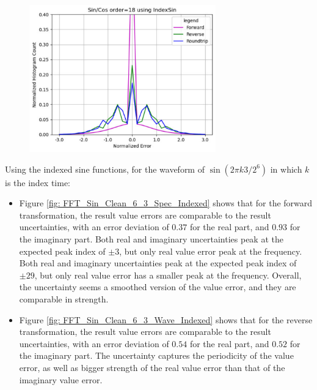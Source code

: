 \documentclass[twoside]{article}
\numberwithin{equation}{section}
\begin{document}
\begin{figure}[p]
\centering
\includegraphics[height=2.5in]{FFT_SinCos_Clean_Histo_Indexed.pdf} 
\label{fig: FFT_SinCos_Clean_Histo_Indexed}
\end{figure}

Using the indexed sine functions, for the waveform of $\sin(2\pi k 3/2^6)$ in which $k$ is the index time:
\begin{itemize}
\item Figure \ref{fig: FFT_Sin_Clean_6_3_Spec_Indexed} shows that for the forward transformation,  the result value errors are comparable to the result uncertainties, with an error deviation of $0.37$ for the real part, and $0.93$ for the imaginary part.
Both real and imaginary uncertainties peak at the expected peak index of $\pm 3$, but only real value error peak at the frequency.
Both real and imaginary uncertainties peak at the expected peak index of $\pm 29$, but only real value error has a smaller peak at the frequency.  
Overall, the uncertainty seems a smoothed version of the value error, and they are comparable in strength.

\item Figure \ref{fig: FFT_Sin_Clean_6_3_Wave_Indexed} shows that for the reverse transformation, the result value errors are comparable to the result uncertainties, with an error deviation of $0.54$ for the real part, and $0.52$ for the imaginary part.
The uncertainty captures the periodicity of the value error, as well as bigger strength of the real value error than that of the imaginary value error.

\end{itemize}
\end{document}
